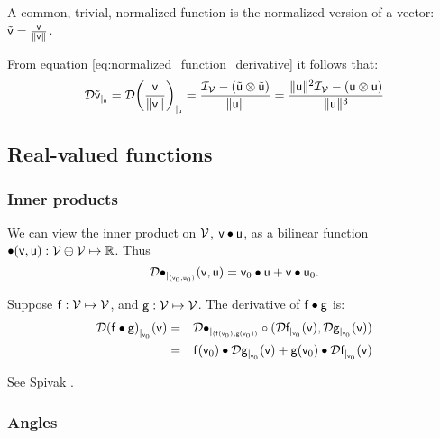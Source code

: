 A common, trivial, normalized function is the normalized version of
a vector: $\tilde{\mathsf{v}} =  \frac{\mathsf{v}}{ \| \mathsf{v} \| }$.

From equation \ref{eq:normalized_function_derivative}
it follows that:
\begin{equation}
\label{eq:normalized_vector_derivative}
{\mathcal{D}{\tilde{\mathsf{v}}}_{\mid_{\mathsf{u}}}}
 =
{\mathcal{D}{ \left( \frac{\mathsf{v}}{ \| \mathsf{v} \| } \right) }_{\mid_{\mathsf{u}}}}
 =
\frac{\mathcal{I}_{\mathcal{V}} - \left( \tilde{\mathsf{u}} \otimes \tilde{\mathsf{u}} \right) }
{ \| \mathsf{u} \| }
 =
\frac{\| \mathsf{u} \|^2 \mathcal{I}_{\mathcal{V}} - \left( \mathsf{u} \otimes \mathsf{u} \right) }
{\| \mathsf{u} \|^3}
\end{equation}


\subsection{Real-valued functions}
\label{sec:derivatives-of-real-valued-functions}


\subsubsection{Inner products}
\label{sec:derivatives-of-inner-products}

We can view the inner product on $\mathcal{V}$, $\mathsf{v} \bullet \mathsf{u}$,
as a bilinear function $\bullet(\mathsf{v},\mathsf{u}) : \mathcal{V} \oplus \mathcal{V} \mapsto \mathbb{R}$.
Thus
\begin{equation}
{\mathcal{D}{\bullet}_{\mid_{(\mathsf{v}_0,\mathsf{u}_0)}}({\mathsf{v},\mathsf{u}})} = \mathsf{v}_0 \bullet \mathsf{u} + \mathsf{v} \bullet \mathsf{u}_0.
\end{equation}

Suppose
$\mathsf{f}:\mathcal{V} \mapsto \mathcal{V}$, and
$\mathsf{g}:\mathcal{V} \mapsto \mathcal{V}$.
The derivative of $\mathsf{f} \bullet \mathsf{g}$ is:
\begin{eqnarray}
\label{eq:dot_derivative}
{\mathcal{D}{(\mathsf{f}\bullet \mathsf{g})}_{\mid_{\mathsf{v}_0}}({\mathsf{v}})}
& =
& {\mathcal{D}{\bullet}_{\mid_{(\mathsf{f}(\mathsf{v}_0),\mathsf{g}(\mathsf{v}_0))}}} \circ ({\mathcal{D}{\mathsf{f}}_{\mid_{\mathsf{v}_0}}({\mathsf{v}})}, {\mathcal{D}{\mathsf{g}}_{\mid_{\mathsf{v}_0}}({\mathsf{v}})})
\\
& =
& \mathsf{f}(\mathsf{v}_0) \bullet {\mathcal{D}{\mathsf{g}}_{\mid_{\mathsf{v}_0}}({\mathsf{v}})}  +  \mathsf{g}(\mathsf{v}_0) \bullet {\mathcal{D}{\mathsf{f}}_{\mid_{\mathsf{v}_0}}({\mathsf{v}})} \nonumber
\end{eqnarray}

See Spivak \cite[ex.~2-13]{spivak-1965}.


\subsubsection{Angles}
\label{sec:derivatives-of-angles}

